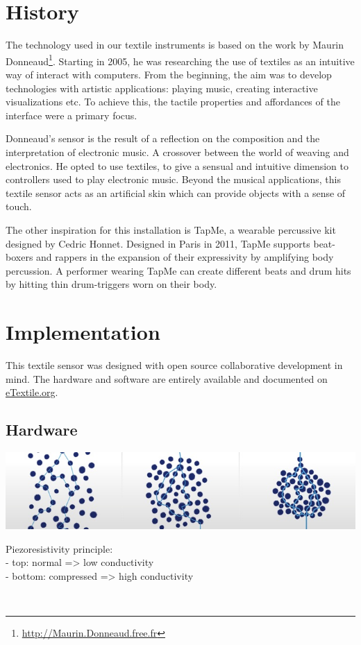 \documentclass{sigchi-ext}
\begin{document}
\section{History}
The technology used in our textile instruments is based on the work by Maurin Donneaud\footnote{\url{http://Maurin.Donneaud.free.fr}}. Starting in 2005, he was researching the use of textiles as an intuitive way of interact with computers. From the beginning, the aim was to develop technologies with artistic applications: playing music, creating interactive visualizations etc. To achieve this, the tactile properties and affordances of the interface were a primary focus.

Donneaud's sensor is the result of a reflection on the composition and the interpretation of electronic music. A crossover between the world of weaving and electronics. He opted to use textiles, to give a sensual and intuitive dimension to controllers used to play electronic music. Beyond the musical applications, this textile sensor acts as an artificial skin which can provide objects with a sense of touch.

The other inspiration for this installation is TapMe, a wearable percussive kit designed by Cedric Honnet. Designed in Paris in 2011, TapMe supports beat-boxers and rappers in the expansion of their expressivity by amplifying body percussion. A performer wearing TapMe can create different beats and drum hits by hitting thin drum-triggers worn on their body.


\section{Implementation}

This textile sensor was designed with open source collaborative development in mind. The hardware and software are entirely available and documented on \url{eTextile.org}.


\subsection{Hardware}

\begin{marginfigure}[-50pt]
  \begin{minipage}{\marginparwidth}
    \centering
    \includegraphics[angle=-90,width=0.65\marginparwidth]{figures/piezoresistivity}
    \caption{Piezoresistivity principle:\\
             - top: normal => low conductivity \\
             - bottom: compressed => high conductivity}~\label{fig:piezoresistivity}
  \end{minipage}
\end{marginfigure}
\end{document}
